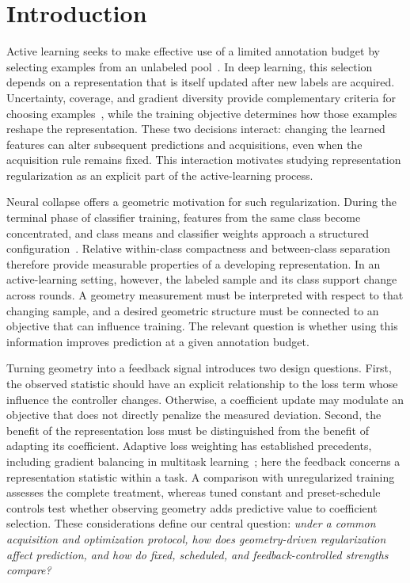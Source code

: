 \documentclass[10pt,a4paper,twocolumn]{article}
\begin{document}
\section{Introduction}\label{sec:intro}

Active learning seeks to make effective use of a limited annotation
budget by selecting examples from an unlabeled
pool~\cite{settles2009active}. In deep learning, this selection depends
on a representation that is itself updated after new labels are acquired.
Uncertainty, coverage, and gradient diversity provide complementary
criteria for choosing examples~\cite{sener2018active,ash2020badge}, while
the training objective determines how those examples reshape the
representation. These two decisions interact: changing the learned
features can alter subsequent predictions and acquisitions, even when
the acquisition rule remains fixed. This interaction motivates studying
representation regularization as an explicit part of the active-learning
process.

Neural collapse offers a geometric motivation for such regularization.
During the terminal phase of classifier training, features from the
same class become concentrated, and class means and classifier weights
approach a structured configuration~\cite{papyan2020prevalence}.
Relative within-class compactness and between-class separation therefore
provide measurable properties of a developing representation. In an
active-learning setting, however, the labeled sample and its class
support change across rounds. A geometry measurement must be interpreted
with respect to that changing sample, and a desired geometric structure
must be connected to an objective that can influence training. The
relevant question is whether using this information improves prediction
at a given annotation budget.

Turning geometry into a feedback signal introduces two design questions.
First, the observed statistic should have an explicit relationship to
the loss term whose influence the controller changes. Otherwise, a
coefficient update may modulate an objective that does not directly
penalize the measured deviation. Second, the benefit of the representation
loss must be distinguished from the benefit of adapting its coefficient.
Adaptive loss weighting has established precedents, including gradient
balancing in multitask learning~\cite{chen2018gradnorm}; here the feedback
concerns a representation statistic within a task. A comparison with
unregularized training assesses the complete treatment, whereas tuned
constant and preset-schedule controls test whether observing geometry
adds predictive value to coefficient selection. These considerations
define our central question: \emph{under a common acquisition and
optimization protocol, how does geometry-driven regularization affect
prediction, and how do fixed, scheduled, and feedback-controlled
strengths compare?}
\end{document}
